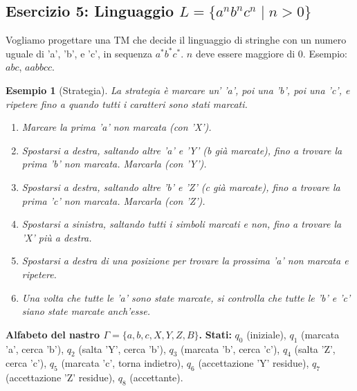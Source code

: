 \documentclass[a4paper]{article}
\newtheorem{example}{Esempio}
\begin{document}
\subsection{Esercizio 5: Linguaggio $L = \{a^n b^n c^n \mid n > 0\}$}

Vogliamo progettare una TM che decide il linguaggio di stringhe con un numero uguale di 'a', 'b', e 'c', in sequenza $a^*b^*c^*$. $n$ deve essere maggiore di $0$. Esempio: $abc$, $aabbcc$.

\begin{example}[Strategia]
La strategia è marcare un' 'a', poi una 'b', poi una 'c', e ripetere fino a quando tutti i caratteri sono stati marcati.
\begin{enumerate}
    \item Marcare la prima 'a' non marcata (con 'X').
    \item Spostarsi a destra, saltando altre 'a' e 'Y' (b già marcate), fino a trovare la prima 'b' non marcata. Marcarla (con 'Y').
    \item Spostarsi a destra, saltando altre 'b' e 'Z' (c già marcate), fino a trovare la prima 'c' non marcata. Marcarla (con 'Z').
    \item Spostarsi a sinistra, saltando tutti i simboli marcati e non, fino a trovare la 'X' più a destra.
    \item Spostarsi a destra di una posizione per trovare la prossima 'a' non marcata e ripetere.
    \item Una volta che tutte le 'a' sono state marcate, si controlla che tutte le 'b' e 'c' siano state marcate anch'esse.
\end{enumerate}
\end{example}

\noindent \textbf{Alfabeto del nastro $\Gamma = \{a, b, c, X, Y, Z, B\}$.}
\noindent \textbf{Stati:} $q_0$ (iniziale), $q_1$ (marcata 'a', cerca 'b'), $q_2$ (salta 'Y', cerca 'b'), $q_3$ (marcata 'b', cerca 'c'), $q_4$ (salta 'Z', cerca 'c'), $q_5$ (marcata 'c', torna indietro), $q_6$ (accettazione 'Y' residue), $q_7$ (accettazione 'Z' residue), $q_8$ (accettante).
\end{document}
